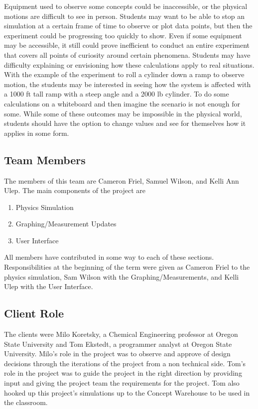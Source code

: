 \noindent Equipment used to observe some concepts could be inaccessible, or the physical motions are difficult to see in person. Students may want to be able to stop an simulation at a certain frame of time to observe or plot data points, but then the experiment could be progressing too quickly to show. Even if some equipment may be accessible, it still could prove inefficient to conduct an entire experiment that covers all points of curiosity around certain phenomena. Students may have difficulty explaining or envisioning how these calculations apply to real situations. With the example of the experiment to roll a cylinder down a ramp to observe motion, the students may be interested in seeing how the system is affected with a 1000 ft tall ramp with a steep angle and a 2000 lb cylinder. To do some calculations on a whiteboard and then imagine the scenario is not enough for some. While some of these outcomes may be impossible in the physical world, students should have the option to change values and see for themselves how it applies in some form.

\subsection{Team Members}
The members of this team are Cameron Friel, Samuel Wilson, and Kelli Ann Ulep. The main components of the project are 
\begin{enumerate}
    \item Physics Simulation
    \item Graphing/Measurement Updates
    \item User Interface
\end{enumerate}
All members have contributed in some way to each of these sections. Responsibilities at the beginning of the term were given as Cameron Friel to the physics simulation, Sam Wilson with the Graphing/Measurements, and Kelli Ulep with the User Interface. 

\subsection{Client Role}
The clients were Milo Koretsky, a Chemical Engineering professor at Oregon State University and Tom Ekstedt, a programmer analyst at Oregon State University. Milo's role in the project was to observe and approve of design decisions through the iterations of the project from a non technical side. Tom's role in the project was to guide the project in the right direction by providing input and giving the project team the requirements for the project. Tom also hooked up this project's simulations up to the Concept Warehouse to be used in the classroom.